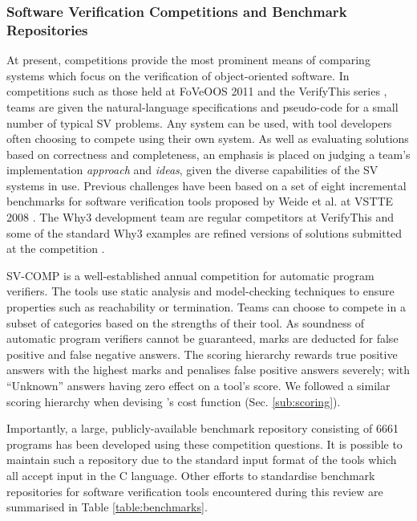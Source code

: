\subsubsection{Software Verification Competitions and Benchmark Repositories}
\label{sub:lrsvmmbench}

At present, competitions provide the most prominent means of comparing systems which focus on the verification of object-oriented software. 
In competitions such as those held at FoVeOOS 2011 \cite{bormer:hal-00789525} and the VerifyThis series \cite{Huisman2015}, teams are given the natural-language specifications and pseudo-code for a small number of typical SV problems. 
Any system can be used, with tool developers often choosing to compete using their own system. 
As well as evaluating solutions based on correctness and completeness, an emphasis is placed on judging a team's implementation \textit{approach} and \textit{ideas}, given the diverse capabilities of the SV systems in use. 
Previous challenges have been based on a set of eight incremental benchmarks for software verification tools proposed by Weide et al. at VSTTE 2008 \cite{Weide2008}. The \textsf{Why3} development team are regular competitors at VerifyThis and some of the standard \textsf{Why3} examples are refined versions of solutions submitted at the competition \cite{verifythis}.  


SV-COMP \cite{Beyer2016, SVCOMP} is a well-established annual competition for automatic program verifiers. 
The tools use static analysis and model-checking techniques to ensure properties such as reachability or termination. 
Teams can choose to compete in a subset of categories based on the strengths of their tool. 
As soundness of automatic program verifiers cannot be guaranteed, marks are deducted for false positive and false negative answers. 
The scoring hierarchy rewards true positive answers with the highest marks and penalises false positive answers severely; with ``Unknown'' answers having zero effect on a tool's score.
We followed a similar scoring hierarchy when devising \where's cost function (Sec. \ref{sub:scoring}).
 
Importantly, a large, publicly-available benchmark repository consisting of 6661 programs  has been developed using these competition questions. It is possible to maintain such a repository due to the standard input format of the tools which all accept input in the C language. Other efforts to standardise benchmark repositories for software verification tools encountered during this review are
summarised in Table \ref{table:benchmarks}.  

